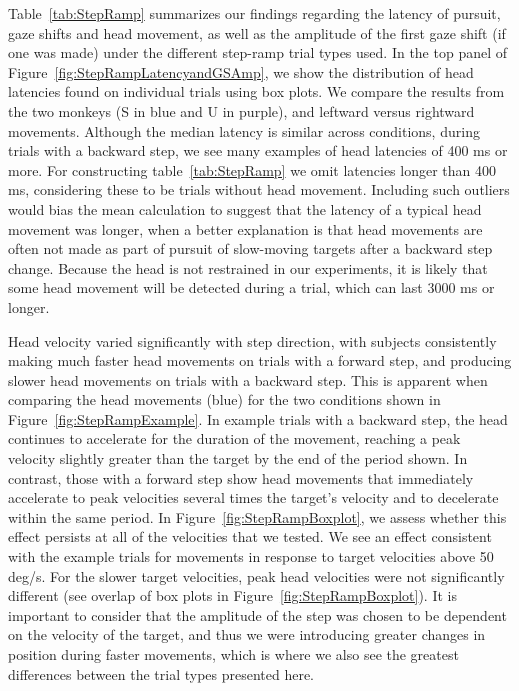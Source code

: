 \documentclass[12pt]{article}
\begin{document}
Table~\ref{tab:StepRamp} summarizes our findings regarding the latency of pursuit, gaze shifts and head movement, as well as the amplitude of the first gaze shift (if one was made) under the different step-ramp trial types used. In the top panel of Figure~\ref{fig:StepRampLatencyandGSAmp}, we show the distribution of head latencies found on individual trials using box plots. We compare the results from the two monkeys (S in blue and U in purple), and leftward versus rightward movements. Although the median latency is similar across conditions, during trials with a backward step, we see many examples of head latencies of 400 ms or more. For constructing table~\ref{tab:StepRamp} we omit latencies longer than 400 ms, considering these to be trials without head movement. Including such outliers would bias the mean calculation to suggest that the latency of a typical head movement was longer, when a better explanation is that head movements are often not made as part of pursuit of slow-moving targets after a backward step change. Because the head is not restrained in our experiments, it is likely that some head movement will be detected during a trial, which can last 3000 ms or longer. 

Head velocity varied significantly with step direction, with subjects consistently making much faster head movements on trials with a forward step, and producing slower head movements on trials with a backward step. This is apparent when comparing the head movements (blue) for the two conditions shown in Figure~\ref{fig:StepRampExample}. In example trials with a backward step, the head continues to accelerate for the duration of the movement, reaching a peak velocity slightly greater than the target by the end of the period shown. In contrast, those with a forward step show head movements that immediately accelerate to peak velocities several times the target’s velocity and to decelerate within the same period.  In Figure~\ref{fig:StepRampBoxplot}, we assess whether this effect persists at all of the velocities that we tested. We see an effect consistent with the example trials for movements in response to target velocities above 50 deg/s. For the slower target velocities, peak head velocities were not significantly different (see overlap of box plots in Figure~\ref{fig:StepRampBoxplot}). It is important to consider that the amplitude of the step was chosen to be dependent on the velocity of the target, and thus we were introducing greater changes in position during faster movements, which is where we also see the greatest differences between the trial types presented here.
\end{document}
